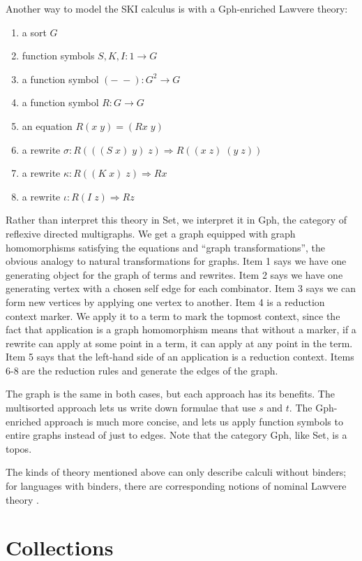 \documentclass[sigplan,9pt,review,anonymous]{acmart}\settopmatter{printfolios=true,printccs=false,printacmref=false}
\newcommand{\maps}{\colon}
\begin{document}
Another way to model the SKI calculus is with a Gph-enriched Lawvere theory:
\begin{enumerate}
  \item a sort $G$
  \item function symbols $S,K,I\maps 1 \to G$
  \item a function symbol $(-\;-)\maps G^2 \to G$
  \item a function symbol $R\maps G \to G$
  \item an equation $R(x\; y) = (Rx\; y)$
  \item a rewrite $\sigma\maps R(((S\; x)\; y)\; z) \Rightarrow R((x\; z)\;(y\; z))$
  \item a rewrite $\kappa\maps R((K\; x)\; z) \Rightarrow Rx$
  \item a rewrite $\iota\maps R(I\; z) \Rightarrow Rz$
\end{enumerate}
Rather than interpret this theory in Set, we interpret it in Gph, the category of reflexive directed multigraphs.  We get a graph equipped with graph homomorphisms satisfying the equations and ``graph transformations'', the obvious analogy to natural transformations for graphs.  Item 1 says we have one generating object for the graph of terms and rewrites. Item 2 says we have one generating vertex with a chosen self edge for each combinator.  Item 3 says we can form new vertices by applying one vertex to another.  Item 4 is a reduction context marker.  We apply it to a term to mark the topmost context, since the fact that application is a graph homomorphism means that without a marker, if a rewrite can apply at some point in a term, it can apply at any point in the term.  Item 5 says that the left-hand side of an application is a reduction context.  Items 6-8 are the reduction rules and generate the edges of the graph.

The graph is the same in both cases, but each approach has its benefits.  The multisorted approach lets us write down formulae that use $s$ and $t$.  The Gph-enriched approach is much more concise, and lets us apply function symbols to entire graphs instead of just to edges.  Note that the category Gph, like Set, is a topos.

The kinds of theory mentioned above can only describe calculi without binders; for languages with binders, there are corresponding notions of nominal Lawvere theory \cite{nominal}.

\section{Collections}
\end{document}
